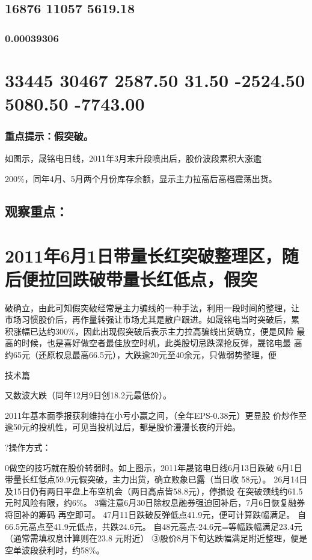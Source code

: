 \documentclass{article}
\begin{document}
\subsection{16876 11057 5619.18}

\subsubsection{0.00039306}

\section{33445 30467 2587.50 31.50 -2524.50 5080.50 -7743.00}

\subsubsection{重点提示：假突破。}

如图示，晟铭电日线，2011年3月末升段喷出后，股价波段累积大涨逾

200\%，同年4月、5月两个月份库存余额，显示主力拉高后高档震荡出货。

\subsection{观察重点：}

\section{2011年6月1日带量长红突破整理区，随后便拉回跌破带量长红低点，假突}

破确立，由此可知假突破经常是主力骗线的一种手法，利用一段时间的整理，让 市场习惯股价后，再作量转强让市场尤其是散户跟进。如晟铭电当时突破后，累 积涨幅已达约300\%，因此出现假突破后表示主力拉高骗线出货确立，便是风险 最高的时候，也是喜好做空者最佳放空时机，此类股切忌跌深抢反弹，晟铭电最 高约65元（还原权息最高66.5元），大跌逾20元至40余元，只做弱势整理，便

\clearpage

技术篇

又数波大跌（同年12月9日创18.2元最低价）。

2011年基本面季报获利维持在小亏小赢之间，（全年EPS-0.38元）更显股 价炒作至逾50元的投机性，可见当投机过后，都是股价漫漫长夜的开始。

?操作方式：

0做空的技巧就在股价转弱时。如上图示，2011年晟铭电日线6月13日跌破 6月1日带量长红低点59.9元假突破，主力出货，确立败象已露（当日收 58元）。 26月14日及15日仍有两日平盘上布空机会（两日高点皆58.8元），停损设 在突破颈线约61.5元时风险有限，约6\%。 3需注意6月30日除权息融券强迫回补后，7月6日恢复融券将回补的筹码 再空即可。 47月11日跌破反弹低点41.9元，便可计算跌幅满足。 自66.5元高点至41.9元低点，共跌24.6元。 自48元高点-24.6元=等幅跌幅满足23.4元（通常需填权息计算则在23.8 元附近） ③股价8月下旬达跌幅满足附近整理，便是空单波段获利时，约58\%。
\end{document}
